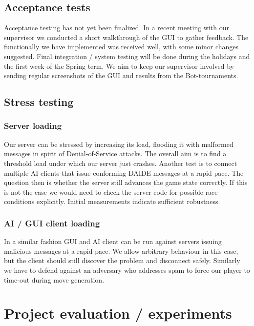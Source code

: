 \documentclass[pdftex,11pt,a4paper]{report}
\begin{document}
\subsection{Acceptance tests}
Acceptance testing has not yet been finalized. In a recent meeting
with our supervisor we conducted a short walkthrough of the GUI to
gather feedback. The functionally we have implemented was received
well, with some minor changes suggested. Final integration / system
testing will be done during the holidays and the first week of the
Spring term. We aim to keep our supervisor involved by sending regular
screenshots of the GUI and results from the Bot-tournaments.

\subsection{Stress testing}

\subsubsection{Server loading}

Our server can be stressed by increasing its load, flooding it with
malformed messages in spirit of Denial-of-Service attacks. The overall
aim is to find a threshold load under which our server just
crashes. Another test is to connect multiple AI clients that issue
conforming DAIDE messages at a rapid pace. The question then is
whether the server still advances the game state correctly. If this is
not the case we would need to check the server code for possible race
conditions explicitly. Initial measurements indicate sufficient
robustness.

\subsubsection{AI / GUI client loading}

In a similar fashion GUI and AI client can be run against servers
issuing malicious messages at a rapid pace. We allow arbitrary
behaviour in this case, but the client should still discover the
problem and disconnect safely. Similarly we have to defend against an
adversary who addresses spam to force our player to time-out during
move generation.


\section{Project evaluation / experiments}
\end{document}

